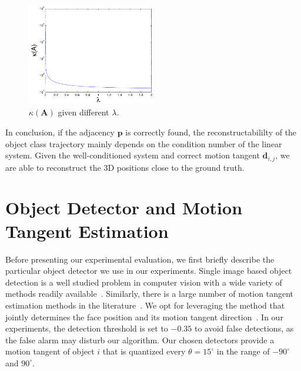 \begin{figure}
\centering
\includegraphics[width=0.5\textwidth]{chapter4/resource/conditionNum_lamda.pdf}
\caption[Illustration of the system condition number given different weight $\lambda$.]{$\kappa(\mathbf{A})$ given different $\lambda$.}
\label{fig:conditionNum_lamda}
\end{figure}

In conclusion, if the adjacency $\mathbf{p}$ is correctly found, the reconstructabililty of the object class trajectory mainly depends on the condition number of the linear system. Given the well-conditioned system and correct motion tangent $\mathbf{d}_{i,j}$, we are able to reconstruct the 3D positions close to the ground truth.




\section{Object Detector and Motion Tangent Estimation}
\label{sec:face_detection}
Before presenting our experimental evaluation, we first briefly describe the particular object detector we use in our experiments.
Single image based object detection is a well studied problem in computer vision with a wide variety of methods readily available~\cite{Zhang2006Local,Dalal2005HOG,lsvm-pami}. Similarly, there is a large number of motion tangent estimation methods in the literature~\cite{Blanz2003face,Gu20063D,jain2010fddb,jones2003fast}.
We opt for leveraging the method that jointly determines the face position and its motion tangent direction~\cite{Xiangxin_CVPR12}.
In our experiments,
the detection threshold is set to $-0.35$ to avoid false detections, as the false alarm may disturb our algorithm. Our chosen detectors provide a motion tangent of object $i$ that is  quantized every $\theta=15^{\circ}$ in the range of $-90^{\circ}$ and $90^{\circ}$.

